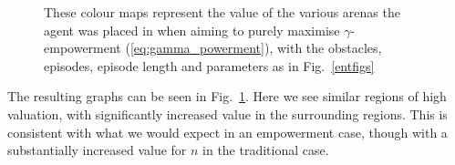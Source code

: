 \documentclass{article}
\begin{document}
\begin{figure}[ht]

\centering
{}
\caption{These colour maps represent the value of the various arenas the agent was placed in when aiming to purely maximise $\gamma$-empowerment (\ref{eq:gamma_powerment}), with the obstacles, episodes, episode length and parameters as in Fig.~\ref{entfigs}\label{entsimilarfigs}}
\end{figure}


The resulting graphs can be seen in Fig.~\ref{entsimilarfigs}. Here we see similar regions of high valuation, with significantly increased value in the surrounding regions. This is consistent with what we would expect in an empowerment case, though with a substantially increased value for $n$ in the traditional case. 
\end{document}
